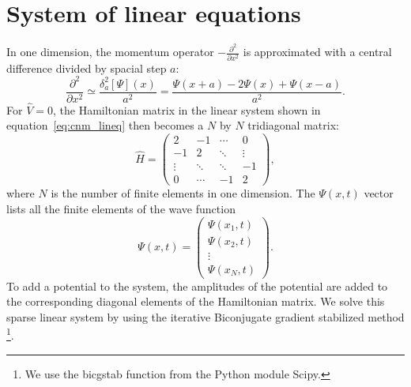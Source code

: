 
\section{System of linear equations}
In one dimension, the momentum operator $-\frac{\partial^2}{\partial x^2}$ is approximated with a central difference divided by spacial step $a$:
\[
    \frac{\partial^2}{\partial x^2}
    \simeq \frac{\delta_a^2[\Psi](x)}{a^2} 
    = \frac{\Psi(x+a)-2\Psi(x)+\Psi(x-a)}{a^2}.
\]For $\hat{V}=0$, the Hamiltonian matrix in the linear system shown in equation~\ref{eq:cnm_lineq} then becomes a $N$ by $N$ tridiagonal matrix:
\[
\hat{H} =
 \begin{pmatrix}
    2       & -1     & \cdots & 0       \\
    -1      & 2      & \ddots & \vdots  \\
    \vdots  & \ddots & \ddots & -1      \\
    0       & \cdots & -1     & 2
 \end{pmatrix},
 \] where $N$ is the number of finite elements in one dimension. The $\Psi(x,t)$ vector lists all the finite elements of the wave function
 \[
\Psi(x,t) =
 \begin{pmatrix}
    \Psi(x_1,t)   \\
    \Psi(x_2,t)   \\
    \vdots      \\
    \Psi(x_N,t)
 \end{pmatrix}.
 \] To add a potential to the system, the amplitudes of the potential are added to the corresponding diagonal elements of the Hamiltonian matrix. We solve this sparse linear system by using the iterative Biconjugate gradient stabilized method \footnote{We use the bicgstab function from the Python module Scipy.}.
 
